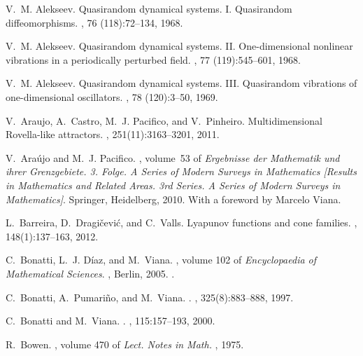 \documentclass[12pt,reqno]{amsart}
\numberwithin{equation}{section}
\theoremstyle{plain}
\theoremstyle{definition}
\begin{document}
\begin{thebibliography}{10}

V.~M. Alekseev.
\newblock Quasirandom dynamical systems. {I}. {Q}uasirandom diffeomorphisms.
, 76 (118):72--134, 1968.

V.~M. Alekseev.
\newblock Quasirandom dynamical systems. {II}. {O}ne-dimensional nonlinear
  vibrations in a periodically perturbed field.
, 77 (119):545--601, 1968.

V.~M. Alekseev.
\newblock Quasirandom dynamical systems. {III}. {Q}uasirandom vibrations of
  one-dimensional oscillators.
, 78 (120):3--50, 1969.

V.~Araujo, A.~Castro, M.~J. Pacifico, and V.~Pinheiro.
\newblock Multidimensional {R}ovella-like attractors.
, 251(11):3163--3201, 2011.

V.~Ara{\'u}jo and M.~J. Pacifico.
, volume~53 of {\em Ergebnisse der
  Mathematik und ihrer Grenzgebiete. 3. Folge. A Series of Modern Surveys in
  Mathematics [Results in Mathematics and Related Areas. 3rd Series. A Series
  of Modern Surveys in Mathematics]}.
\newblock Springer, Heidelberg, 2010.
\newblock With a foreword by Marcelo Viana.

L.~Barreira, D.~Dragi{\v{c}}evi{\'c}, and C.~Valls.
\newblock Lyapunov functions and cone families.
, 148(1):137--163, 2012.

C.~Bonatti, L.~J. D{\'i}az, and M.~Viana.
, volume {102} of {\em
  {Encyclopaedia of Mathematical Sciences}}.
, {Berlin}, {2005}.
.

C.~Bonatti, A.~Pumari{\~n}o, and M.~Viana.
.
,
  {325}({8}):{883--888}, {1997}.

C.~Bonatti and M.~Viana.
.
, {115}:{157--193}, {2000}.

R.~Bowen.
, volume {470} of {\em {Lect. Notes in Math.}}
, {1975}.


\end{thebibliography}
\end{document}
